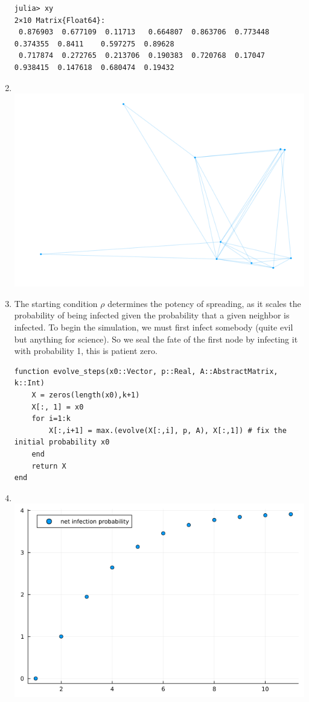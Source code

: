 \documentclass[]{exam}
\begin{document}
\begin{questions}
\begin{enumerate}[label=\arabic*.]
\begin{Verbatim}[breaklines]
julia> xy
2×10 Matrix{Float64}:
 0.876903  0.677109  0.11713   0.664807  0.863706  0.773448  0.374355  0.8411    0.597275  0.89628
 0.717874  0.272765  0.213706  0.190383  0.720768  0.17047   0.938415  0.147618  0.680474  0.19432
	\end{Verbatim}
	\item ~ \\
		\includegraphics[width=\textwidth]{code/q5-p2.png}
	\item The starting condition $\rho$ determines the potency of spreading, as it scales the probability of being infected given the probability that a given neighbor is infected. To begin the simulation, we must first infect somebody (quite evil but anything for science). So we seal the fate of the first node by infecting it with probability 1, this is patient zero.
		\begin{lstlisting}
function evolve_steps(x0::Vector, p::Real, A::AbstractMatrix, k::Int)
	X = zeros(length(x0),k+1)
	X[:, 1] = x0
	for i=1:k
		X[:,i+1] = max.(evolve(X[:,i], p, A), X[:,1]) # fix the initial probability x0
	end
	return X
end
		\end{lstlisting}
	\item ~ \\
		\includegraphics[width=\textwidth]{code/q5-p4.png}

\end{enumerate}
\end{questions}
\end{document}
